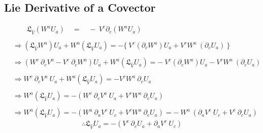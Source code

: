 \documentclass[14pt]{article} %
\begin{document}
\subsection{Lie Derivative of a Covector}
\begin{align*}
&\quad \quad \mathfrak{L}_{\hat{V}} (W^a U_a) \quad = \quad - ~V^c \partial_c (W^a U_a) \\\\
&\Rightarrow (\mathfrak{L}_{\hat{V}} W^a) U_a + W^a (\mathfrak{L}_{\hat{V}} U_a) = - \{~V^c (\partial_c W^a)U_a + V^c W^a~ (\partial_c U_a)~\} \\\\
&\Rightarrow (W^c~ \partial_c V^a - V^c~ \partial_c W^a) U_a + W^a (\mathfrak{L}_{\hat{V}} U_a) = -~V^c (\partial_c W^a)U_a - V^c W^a~ (\partial_c U_a) \\\\
& \Rightarrow W^c~ \partial_c V^a ~U_a + W^a (\mathfrak{L}_{\hat{V}} U_a) = - V^c W^a~\partial_c U_a \\\\
& \Rightarrow W^a (\mathfrak{L}_{\hat{V}} U_a) = - (W^c~ \partial_c V^a ~U_a+V^c W^a~\partial_c U_a) \\\\
& \Rightarrow W^a (\mathfrak{L}_{\hat{V}} U_a) = - (W^a~ \partial_a V^c ~U_c+V^c W^a~\partial_c U_a) = -~W^a~(\partial_a V^c ~U_c+V^c~\partial_c U_a)
\end{align*}
\[
\boxed{\therefore \mathfrak{L}_{\hat{V}} U_a = -(V^c~\partial_c U_a + \partial_a V^c ~U_c)}
\]

\end{document}
